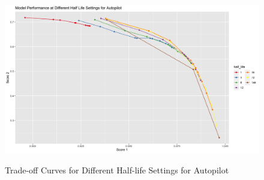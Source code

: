 \documentclass{article}
\begin{document}
\begin{figure}
  \caption{Trade-off Curves for Different Half-life Settings for Autopilot}
  \centering
  \includegraphics{images/ModelPerformanceatDifferentHalfLifeSettingsforAutopilot.png}
  \label{fig:fig1.11.2}
\end{figure}
\end{document}
